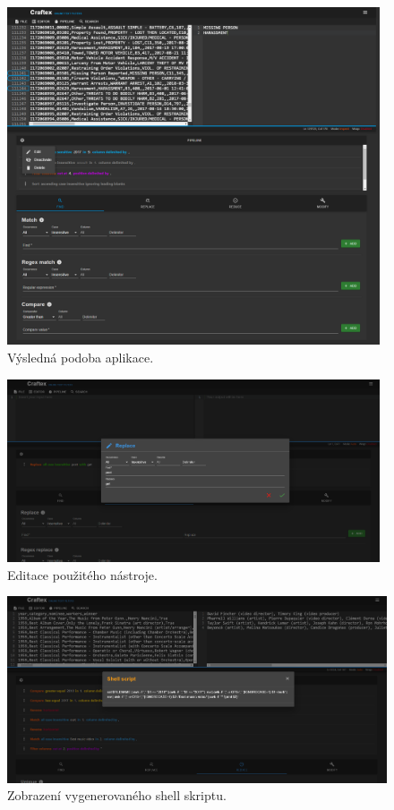 \begin{figure}[hbt]
	\centering
	\includegraphics[width=0.98\textwidth]{obrazky-figures/vysledna_podoba.png}
	\caption{Výsledná podoba aplikace.}
	\label{obr:Výsledná podoba aplikace}
\end{figure}
\begin{figure}[hbt]
	\centering
	\includegraphics[width=0.98\textwidth]{obrazky-figures/editace_nastroje.PNG}
	\caption{Editace použitého nástroje.}
	\label{obr:Editace použitého nástroje}
\end{figure}
\begin{figure}[hbt]
	\centering
	\includegraphics[width=1\textwidth]{obrazky-figures/shell_dialog.PNG}
	\caption{Zobrazení vygenerovaného shell skriptu.}
	\label{obr:Zobrazení shell skriptu}
\end{figure}

